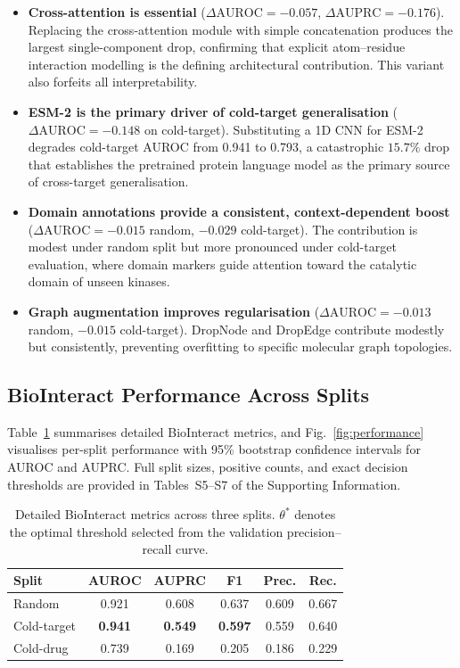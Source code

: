 \documentclass[fleqn,10pt]{wlscirep}
\begin{document}
\begin{itemize}[leftmargin=*]
\item \textbf{Cross-attention is essential}
  ($\Delta\mathrm{AUROC}=-0.057$, $\Delta\mathrm{AUPRC}=-0.176$).
  Replacing the cross-attention module with simple concatenation produces the
  largest single-component drop, confirming that explicit atom--residue
  interaction modelling is the defining architectural contribution.  This variant
  also forfeits all interpretability.

\item \textbf{ESM-2 is the primary driver of cold-target generalisation}
  ($\Delta\mathrm{AUROC}=-0.148$ on cold-target).  Substituting a 1D CNN for
  ESM-2 degrades cold-target AUROC from 0.941 to 0.793, a catastrophic
  $15.7\%$ drop that establishes the pretrained protein language model as the
  primary source of cross-target generalisation.

\item \textbf{Domain annotations provide a consistent, context-dependent boost}
  ($\Delta\mathrm{AUROC}=-0.015$ random, $-0.029$ cold-target).  The contribution
  is modest under random split but more pronounced under cold-target evaluation,
  where domain markers guide attention toward the catalytic domain of unseen
  kinases.

\item \textbf{Graph augmentation improves regularisation}
  ($\Delta\mathrm{AUROC}=-0.013$ random, $-0.015$ cold-target).
  DropNode and DropEdge contribute modestly but consistently, preventing
  overfitting to specific molecular graph topologies.
\end{itemize}

\subsection{BioInteract Performance Across Splits}

Table~\ref{tab:results} summarises detailed BioInteract metrics, and
Fig.~\ref{fig:performance} visualises per-split performance with 95\%
bootstrap confidence intervals for AUROC and AUPRC.  Full split sizes, positive
counts, and exact decision thresholds are provided in Tables~S5--S7 of the
Supporting Information.

\begin{table}[htbp]
\centering
\caption{Detailed BioInteract metrics across three splits.  $\theta^*$ denotes
  the optimal threshold selected from the validation precision--recall curve.}
\label{tab:results}
\begin{tabular}{lccccc}
\toprule
\textbf{Split} & \textbf{AUROC} & \textbf{AUPRC} & \textbf{F1}
               & \textbf{Prec.} & \textbf{Rec.} \\
\midrule
Random      & 0.921 & 0.608 & 0.637 & 0.609 & 0.667 \\
Cold-target & \textbf{0.941} & \textbf{0.549} & \textbf{0.597} & 0.559 & 0.640 \\
Cold-drug   & 0.739 & 0.169 & 0.205 & 0.186 & 0.229 \\
\bottomrule
\end{tabular}
\end{table}
\end{document}
